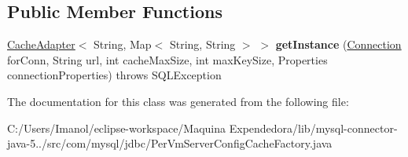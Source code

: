 \subsection*{Public Member Functions}
\begin{DoxyCompactItemize}
\item 
\mbox{\label{classcom_1_1mysql_1_1jdbc_1_1_per_vm_server_config_cache_factory_aa05858a240067d9e368583fe646146dd}} 
\mbox{\hyperlink{interfacecom_1_1mysql_1_1jdbc_1_1_cache_adapter}{Cache\+Adapter}}$<$ String, Map$<$ String, String $>$ $>$ {\bfseries get\+Instance} (\mbox{\hyperlink{interfacecom_1_1mysql_1_1jdbc_1_1_connection}{Connection}} for\+Conn, String url, int cache\+Max\+Size, int max\+Key\+Size, Properties connection\+Properties)  throws S\+Q\+L\+Exception 
\end{DoxyCompactItemize}


The documentation for this class was generated from the following file\+:\begin{DoxyCompactItemize}
\item 
C\+:/\+Users/\+Imanol/eclipse-\/workspace/\+Maquina Expendedora/lib/mysql-\/connector-\/java-\/5../src/com/mysql/jdbc/Per\+Vm\+Server\+Config\+Cache\+Factory.\+java\end{DoxyCompactItemize}
